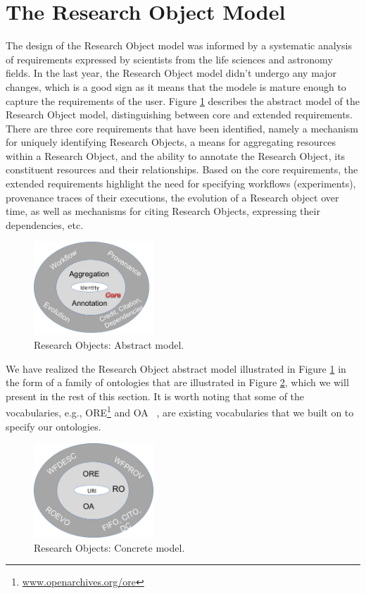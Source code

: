 \section{The Research Object Model}
\label{sec:romodel}

The design of the Research Object model was informed by a systematic analysis of requirements expressed by scientists from the life sciences and astronomy fields. In the last year, the Research Object model didn't undergo any major changes, which is a good sign as it means that the modele is mature enough to capture the requirements of the user. Figure \ref{fig:wm_abstract} describes the abstract model of the Research Object model, distinguishing between core and extended requirements. There are three core requirements that have been identified, namely a mechanism for uniquely identifying Research Objects, a means for aggregating resources within a Research Object, and the ability to annotate the Research Object, its constituent resources and their relationships. Based on the core requirements, the extended requirements highlight the need for specifying workflows (experiments), provenance traces of their executions, the evolution of a Research object over time, as well as mechanisms for citing Research Objects, expressing their dependencies, etc.


\begin{figure}[ht]
  \centering
  \includegraphics[width=0.4\textwidth]{Figures/wm_abstract.png}
  \caption{Research Objects: Abstract model.}
  \label{fig:wm_abstract}
\end{figure}

We have realized the Research Object abstract model illustrated in Figure \ref{fig:wm_abstract} in the form of a family of ontologies that are illustrated in Figure \ref{fig:wm_concrete}, which we will present in the rest of this section.  It is worth noting that some of the vocabularies, e.g., ORE\footnote{\url{www.openarchives.org/ore}} and OA ~\cite{COG11}, are existing vocabularies that we built on to specify our ontologies.

 \begin{figure}[ht]
  \centering
  \includegraphics[width=0.4\textwidth]{Figures/wm_concrete.png}
  \caption{Research Objects: Concrete model.}
  \label{fig:wm_concrete}
\end{figure}

